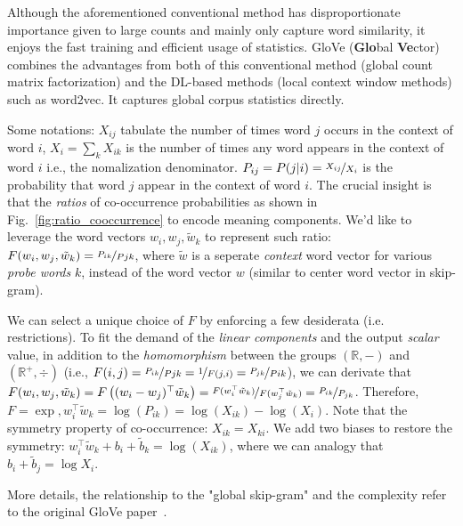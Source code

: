 
Although the aforementioned conventional method has disproportionate importance given to large counts and mainly only capture word similarity, it enjoys the fast training and efficient usage of statistics.
GloVe (\textbf{Glo}bal \textbf{Ve}ctor)  combines the advantages from both of this conventional method (global count matrix factorization) and the DL-based methods (local context window methods) such as word2vec.
It captures global corpus statistics directly.


Some notations: $X_{ij}$ tabulate the number of times word $j$ occurs in the context of word $i$, $X_i = \sum_{k} X_{ik}$ is the number of times any word appears in the context of word $i$ i.e., the nomalization denominator.
$P_{ij} = P(j|i) = \nicefrac{X_{ij}}{X_i}$ is the probability that word $j$ appear in the context of word $i$.
The crucial insight is that the \emph{ratios} of co-occurrence probabilities as shown in Fig.~\ref{fig:ratio_cooccurrence} to encode meaning components.
We'd like to leverage the word vectors $w_i, w_j, \tilde{w}_k$ to represent such ratio: $F(w_i, w_j, \tilde{w}_k) = \nicefrac{P_{ik}}{P{jk}}$, where $\tilde{w}$ is a seperate \emph{context} word vector for various \emph{probe words} $k$, instead of the word vector $w$ (similar to center word vector in skip-gram).

We can select a unique choice of $F$ by enforcing a few desiderata (i.e. restrictions).
To fit the demand of the \emph{linear components} and the output \emph{scalar} value, in addition to the \emph{homomorphism}
between the groups $(\mathbb{R}, -)$ and $(\mathbb{R}^+, \div)$ (i.e., $F(i,j) = \nicefrac{P_{ik}}{P{jk}} = \nicefrac{1}{F(j,i)} = \nicefrac{P_{jk}}{P{ik}}$), we can derivate that $F(w_i, w_j, \tilde{w}_k) = F\left((w_i - w_j)^\top \tilde{w}_k\right) = \nicefrac{F(w_i^\top \tilde{w}_k)}{F(w_j^\top \tilde{w}_k)} = \nicefrac{P_{ik}}{P_{jk}}$.
Therefore, $F=\exp, w_i^\top \tilde{w}_k = \log(P_{ik}) = \log (X_{ik}) - \log (X_i)$.
Note that the symmetry property of co-occurrence: $X_{ik} = X_{ki}$.
We add two biases to restore the symmetry: $w_i^\top \tilde{w}_k + b_i + \tilde{b}_k = \log (X_{ik})$, where we can analogy that $b_i + \tilde{b}_j = \log X_{i}$.

More details, the relationship to the "global skip-gram" and the complexity refer to the original GloVe paper~.

